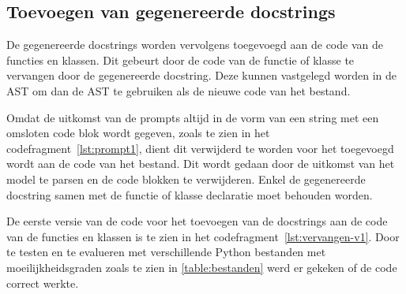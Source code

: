 \subsection{Toevoegen van gegenereerde docstrings}
\label{sec:bestanddocumentatie-vervangen}
De gegenereerde docstrings worden vervolgens toegevoegd aan de code van de functies en klassen.
Dit gebeurt door de code van de functie of klasse te vervangen door de gegenereerde docstring.
Deze kunnen vastgelegd worden in de AST om dan de AST te gebruiken als de nieuwe code van het bestand.

Omdat de uitkomst van de prompts altijd in de vorm van een string met een omsloten code blok wordt gegeven, zoals te zien in het codefragment~\ref{lst:prompt1}, dient dit verwijderd te worden voor het toegevoegd wordt aan de code van het bestand. 
Dit wordt gedaan door de uitkomst van het model te parsen en de code blokken te verwijderen.
Enkel de gegenereerde docstring samen met de functie of klasse declaratie moet behouden worden.

De eerste versie van de code voor het toevoegen van de docstrings aan de code van de functies en klassen is te zien in het codefragment~\ref{lst:vervangen-v1}.
Door te testen en te evalueren met verschillende Python bestanden met moeilijkheidsgraden zoals te zien in \ref{table:bestanden} werd er gekeken of de code correct werkte.

\begin{table}[h!]
    \centering
    \caption{Aantal functies en klassen in de verschillende Python bestanden.}
    \label{table:bestanden}
\end{table}

